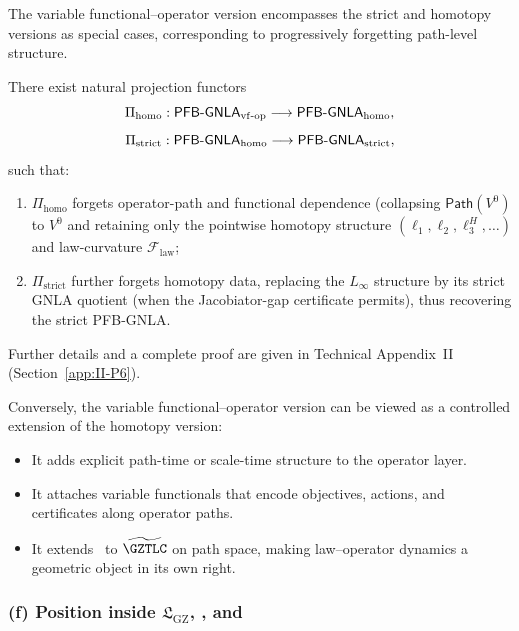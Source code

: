 \documentclass[11pt]{book}
\theoremstyle{plain}
\theoremstyle{definition}
\newcommand{\GZLS}{\ensuremath{\mathfrak{L}_{\mathrm{GZ}}}}       \newcommand{\GZLT}{\ensuremath{M_{!w}}}                           \newcommand{\GZLOC}{\ensuremath{A_M}}                             \newcommand{\GZLCurv}{\ensuremath{\mathcal{F}_{\mathrm{law}}}}
\begin{document}
The variable functional--operator version encompasses the strict and
homotopy versions as special cases, corresponding to progressively
forgetting path-level structure.

\begin{proposition}
There exist natural projection functors
  \[
     \Pi_{\mathrm{homo}}:
       \mathsf{PFB\text- GNLA}_{\mathrm{vf\text- op}}
       \longrightarrow
       \mathsf{PFB\text- GNLA}_{\mathrm{homo}},
  \]
  \[
     \Pi_{\mathrm{strict}}:
       \mathsf{PFB\text- GNLA}_{\mathrm{homo}}
       \longrightarrow
       \mathsf{PFB\text- GNLA}_{\mathrm{strict}},
  \]
  such that:
  \begin{enumerate}[label=\roman*)]
    \item $\Pi_{\mathrm{homo}}$ forgets operator-path and functional
          dependence (collapsing $\mathsf{Path}(V^0)$ to $V^0$ and
          retaining only the pointwise homotopy structure
          $(\ell_1,\ell_2,\ell_3^H,\dots)$ and law-curvature
          \GZLCurv;
    \item $\Pi_{\mathrm{strict}}$ further forgets homotopy data,
          replacing the $L_\infty$ structure by its strict GNLA
          quotient (when the Jacobiator-gap certificate permits),
          thus recovering the strict PFB-GNLA.
  \end{enumerate}
  Further details and a complete proof are given in Technical Appendix~II
  (Section~\ref{app:II-P6}).
\end{proposition}

Conversely, the variable functional--operator version can be viewed as
a controlled extension of the homotopy version:

\begin{itemize}
  \item It adds explicit path-time or scale-time structure to the
        operator layer.
  \item It attaches variable functionals that encode objectives,
        actions, and certificates along operator paths.
  \item It extends \GZTLC\ to $\widetilde{\GZTLC}$ on path space,
        making law–operator dynamics a geometric object in its own
        right.
\end{itemize}



\subsubsection*{(f) Position inside \texorpdfstring{\GZLS}{GZ-LS}, \texorpdfstring{\GZTLC}{GZ-TLC}, and \texorpdfstring{\GZGMS}{GZ-GMS}}
\end{document}
